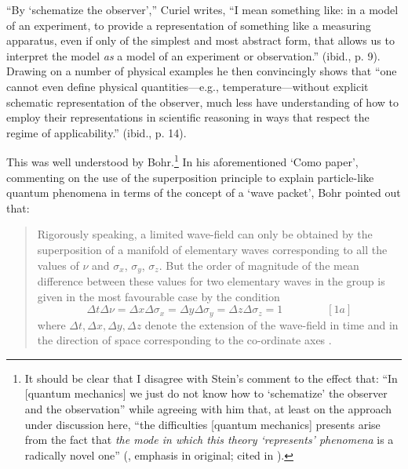 \documentclass[12pt,english,twoside]{article}
\numberwithin{equation}{section}
\begin{document}
``By `schematize the observer','' Curiel writes, ``I mean something like: in a model of an experiment, to provide a representation of something like a measuring apparatus, even if only of the simplest and most abstract form, that allows us to interpret the model \emph{as} a model of an experiment or observation.'' (ibid., p. 9).
%
Drawing on a number of physical examples he then convincingly shows that ``one cannot even define physical quantities---e.g., temperature---without explicit schematic representation of the observer, much less have understanding of how to employ their representations in scientific reasoning in ways that respect the regime of applicability.'' (ibid., p. 14).

This was well understood by Bohr.\footnote{It should be clear that I disagree with Stein's comment to the effect that: ``In [quantum mechanics] we just do not know how to `schematize' the observer and the observation'' \citep[p. 653]{stein1994} while agreeing with him that, at least on the approach under discussion here, ``the difficulties [quantum mechanics] presents arise from the fact that \emph{the mode in which this theory `represents' phenomena} is a radically novel one'' (\citealt[p. 59]{stein1989}, emphasis in original; cited in \citealt[p. 653]{stein1994}).} In his aforementioned `Como paper', commenting on the use of the superposition principle to explain particle-like quantum phenomena in terms of the concept of a `wave packet', Bohr pointed out that:

\begin{quote}
Rigorously speaking, a limited wave-field can only be obtained by the superposition of a manifold of elementary waves corresponding to all the values of $\nu$ and $\sigma_x$, $\sigma_y$, $\sigma_z$. But the order of magnitude of the mean difference between these values for two elementary waves in the group is given in the most favourable case by the condition $$\Delta t \Delta \nu = \Delta x \Delta \sigma_x = \Delta y \Delta \sigma_y = \Delta z \Delta \sigma_z = 1\qquad\qquad [1a]$$ where $\Delta t, \Delta x, \Delta y, \Delta z$ denote the extension of the wave-field in time and in the direction of space corresponding to the co-ordinate axes \citep[p. 581]{bohr1928}.
\end{quote}
\end{document}
